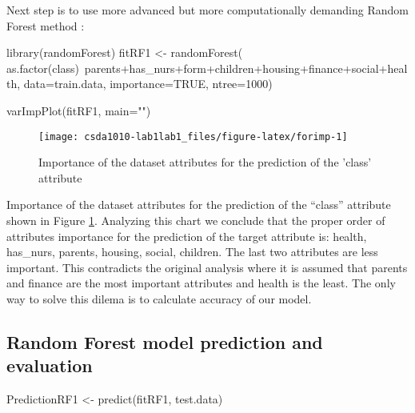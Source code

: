 Next step is to use more advanced but more computationally demanding
Random Forest method \citep{R-randomForest}:

\begin{Schunk}
\begin{Sinput}
library(randomForest)
fitRF1 <- randomForest(
  as.factor(class)~parents+has_nurs+form+children+housing+finance+social+health,
  data=train.data, importance=TRUE, ntree=1000)
\end{Sinput}
\end{Schunk}

\begin{Schunk}
\begin{Sinput}
varImpPlot(fitRF1, main="")
\end{Sinput}
\begin{figure}[h]

{\centering \texttt{[image: csda1010-lab1lab1\_files/figure-latex/forimp-1]} 

}

\caption[Importance of the dataset attributes for the prediction of the 'class' attribute]{Importance of the dataset attributes for the prediction of the 'class' attribute}\label{fig:forimp}
\end{figure}
\end{Schunk}

Importance of the dataset attributes for the prediction of the ``class''
attribute shown in Figure \ref{fig:forimp}. Analyzing this chart we
conclude that the proper order of attributes importance for the
prediction of the target attribute is: health, has\_nurs, parents,
housing, social, children. The last two attributes are less important.
This contradicts the original analysis \citep{noauthor_uci_nodate} where
it is assumed that parents and finance are the most important attributes
and health is the least. The only way to solve this dilema is to
calculate accuracy of our model.

\newpage

\hypertarget{random-forest-model-prediction-and-evaluation}{%
\subsection{Random Forest model prediction and
evaluation}\label{random-forest-model-prediction-and-evaluation}}

\begin{Schunk}
\begin{Sinput}
PredictionRF1 <- predict(fitRF1, test.data)
\end{Sinput}
\end{Schunk}

